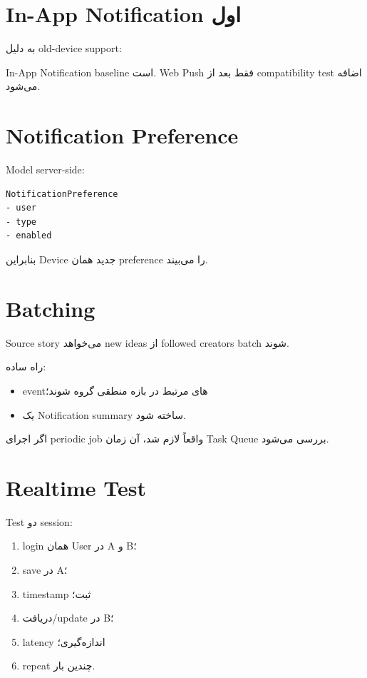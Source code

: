 \section{In-App Notification اول}

به دلیل old-device support:
\begin{decisionbox}
In-App Notification baseline است. Web Push فقط بعد از compatibility test اضافه می‌شود.
\end{decisionbox}

\section{Notification Preference}

Model server-side:
\begin{latin}
\begin{lstlisting}
NotificationPreference
- user
- type
- enabled
\end{lstlisting}
\end{latin}

بنابراین Device جدید همان preference را می‌بیند.

\section{Batching}

Source story می‌خواهد new ideas از followed creators batch شوند.

راه ساده:
\begin{itemize}
  \item eventهای مرتبط در بازه منطقی گروه شوند؛
  \item یک Notification summary ساخته شود.
\end{itemize}

اگر اجرای periodic job واقعاً لازم شد، آن زمان Task Queue بررسی می‌شود.

\section{Realtime Test}

Test دو session:
\begin{enumerate}
  \item login همان User در A و B؛
  \item save در A؛
  \item timestamp ثبت؛
  \item دریافت/update در B؛
  \item latency اندازه‌گیری؛
  \item repeat چندین بار.
\end{enumerate}

